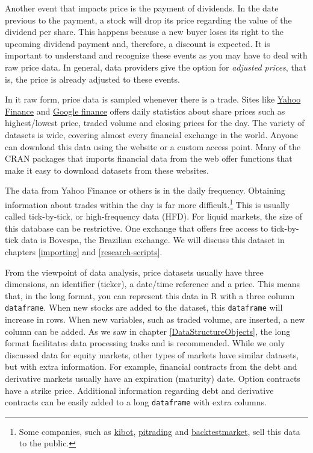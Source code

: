 \documentclass[11pt,]{book}
\let\rmarkdownfootnote\footnote%
\def\footnote{\protect\rmarkdownfootnote}
\begin{document}
Another event that impacts price is the payment of dividends. In the
date previous to the payment, a stock will drop its price regarding the
value of the dividend per share. This happens because a new buyer loses
its right to the upcoming dividend payment and, therefore, a discount is
expected. It is important to understand and recognize these events as
you may have to deal with raw price data. In general, data providers
give the option for \emph{adjusted prices}, that is, the price is
already adjusted to these events.

In it raw form, price data is sampled whenever there is a trade. Sites
like \href{https://finance.yahoo.com/}{Yahoo Finance} and
\href{https://www.google.com/finance}{Google finance} offers daily
statistics about share prices such as highest/lowest price, traded
volume and closing prices for the day. The variety of datasets is wide,
covering almost every financial exchange in the world. Anyone can
download this data using the website or a custom access point. Many of
the CRAN packages that imports financial data from the web offer
functions that make it easy to download datasets from these websites.

The data from Yahoo Finance or others is in the daily frequency.
Obtaining information about trades within the day is far more
difficult.\footnote{Some companies, such as
  \href{http://www.kibot.com}{kibot},
  \href{http://www.pitrading.com/}{pitrading} and
  \href{https://www.backtestmarket.com/}{backtestmarket}, sell this data
  to the public.} This is usually called tick-by-tick, or high-frequency
data (HFD). For liquid markets, the size of this database can be
restrictive. One exchange that offers free access to tick-by-tick data
is Bovespa, the Brazilian exchange. We will discuss this dataset in
chapters \ref{importing} and \ref{research-scripts}.

From the viewpoint of data analysis, price datasets usually have three
dimensions, an identifier (ticker), a date/time reference and a price.
This means that, in the long format, you can represent this data in R
with a three column \texttt{dataframe}. When new stocks are added to the
dataset, this \texttt{dataframe} will increase in rows. When new
variables, such as traded volume, are inserted, a new column can be
added. As we saw in chapter \ref{DataStructureObjects}, the long format
facilitates data processing tasks and is recommended. While we only
discussed data for equity markets, other types of markets have similar
datasets, but with extra information. For example, financial contracts
from the debt and derivative markets usually have an expiration
(maturity) date. Option contracts have a strike price. Additional
information regarding debt and derivative contracts can be easily added
to a long \texttt{dataframe} with extra columns.
\end{document}
